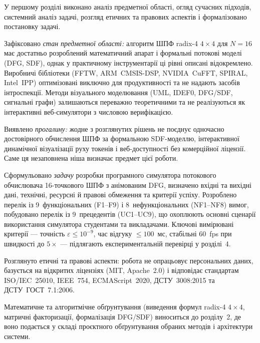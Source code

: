 У першому розділі виконано аналіз предметної області, огляд сучасних
підходів, системний аналіз задачі, розгляд етичних та правових
аспектів і формалізовано постановку задачі.

Зафіксовано \emph{стан предметної області:} алгоритм ШПФ radix-4
$4\times4$ для $N = 16$ має достатньо розроблений математичний
апарат і формальні потокові моделі (DFG, SDF), однак у практичному
інструментарії ці рівні описані відокремлено. Виробничі бібліотеки
(FFTW, ARM~CMSIS-DSP, NVIDIA~CuFFT, SPIRAL, Intel~IPP) оптимізовані
виключно для продуктивності та не надають засобів інтроспекції.
Методи візуального моделювання (UML, IDEF0, DFG/SDF, сигнальні
графи) залишаються переважно теоретичними та не реалізуються як
інтерактивні веб-симулятори з числовою верифікацією.

Виявлено \emph{прогалину:} жодне з розглянутих рішень не поєднує
одночасно достовірного обчислення ШПФ за формальною SDF-моделлю,
інтерактивної динамічної візуалізації руху токенів і веб-доступності
без комерційної ліцензії. Саме ця незаповнена ніша визначає предмет
цієї роботи.

Сформульовано \emph{задачу} розробки програмного симулятора потокового
обчислювача 16-точкового ШПФ з анімованим DFG, визначено вхідні та
вихідні дані, технічні, ресурсні й правові обмеження та критерії
успіху. Розроблено перелік із 9~функціональних (F1--F9) і 8~нефункціональних
(NF1--NF8) вимог, побудовано перелік із 9~прецедентів (UC1--UC9),
що охоплюють основні сценарії використання симулятора студентами
та викладачами. Ключові вимірювані критерії --- точність $\varepsilon
\le 10^{-9}$, час відгуку $\le 100$~мс, стабільні 60~fps при
швидкості до $5\times$ --- підлягають експериментальній перевірці
у розділі~4.

Розглянуто етичні та правові аспекти: робота не опрацьовує
персональних даних, базується на відкритих ліцензіях (MIT,
Apache~2.0) і відповідає стандартам ISO/IEC~25010, IEEE~754,
ECMAScript~2020, ДСТУ~3008:2015 та ДСТУ~ГОСТ~7.1:2006.

Математичне та алгоритмічне обґрунтування (виведення формул
radix-4 $4\times4$, матричні факторизації, формалізація DFG/SDF)
виноситься до розділу~2, де воно подається у складі проєктного
обґрунтування обраних методів і архітектури системи.
